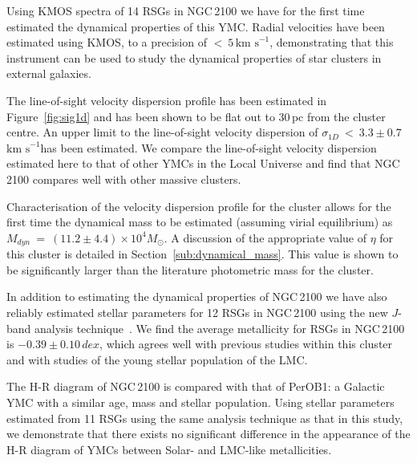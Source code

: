 \documentclass[useAMS,usenatbib]{mn2e}
\def\kms{$\mbox{km s}^{-1}$}
\begin{document}
Using KMOS spectra of 14 RSGs in NGC\,2100 we have for the first time estimated the dynamical properties of this YMC.
Radial velocities have been estimated using KMOS, to a precision of $<~5$\,\kms, demonstrating that this instrument can be used to study the dynamical properties of star clusters in external galaxies.

The line-of-sight velocity dispersion profile has been estimated in Figure~\ref{fig:sig1d} and has been shown to be flat out to 30\,pc from the cluster centre.
An upper limit to the line-of-sight velocity dispersion of $\sigma_{1D}~<~3.3\pm0.7\,$\kms has been estimated.
We compare the line-of-sight velocity dispersion estimated here to that of other YMCs in the Local Universe and find that NGC\,2100 compares well with other massive clusters.

Characterisation of the velocity dispersion profile for the cluster allows for the first time the dynamical mass to be estimated (assuming virial equilibrium) as $M_{dyn}~=~(11.2\pm4.4)\times 10^{4}M_{\odot}$.
A discussion of the appropriate value of $\eta$ for this cluster is detailed in Section~\ref{sub:dynamical_mass}.
This value is shown to be significantly larger than the literature photometric mass for the cluster.

In addition to estimating the dynamical properties of NGC\,2100 we have also reliably estimated stellar parameters for 12 RSGs in NGC\,2100 using the new $J$-band analysis technique~\citep{2010MNRAS.407.1203D}.
We find the average metallicity for RSGs in NGC\,2100 is $-0.39\pm0.10\,dex$, which agrees well with previous studies within this cluster and with studies of the young stellar population of the LMC.

The H-R diagram of NGC\,2100 is compared with that of PerOB1: a Galactic YMC with a similar age, mass and stellar population.
Using stellar parameters estimated from 11 RSGs using the same analysis technique as that in this study, we demonstrate that there exists no significant difference in the appearance of the H-R diagram of YMCs between Solar- and LMC-like metallicities.
\end{document}
